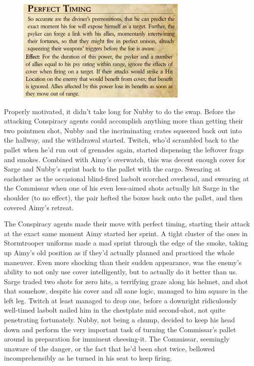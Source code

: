 \begin{figure}
	\begin{center}
		\includegraphics[width=\figwidth]{pics/21/108.png}
	\end{center}
\end{figure}
Properly motivated, it didn't take long for Nubby to do the swap. 
Before the attacking Conspiracy agents could accomplish anything more than getting their two pointmen shot, Nubby and the incriminating crates squeezed back out into the hallway, and the withdrawal started. 
Twitch, who'd scrambled back to the pallet when he'd run out of grenades again, started dispensing the leftover frags and smokes. 
Combined with Aimy's overwatch, this was decent enough cover for Sarge and Nubby's sprint back to the pallet with the cargo. 
Swearing at eachother as the occasional blind-fired lasbolt scorched overhead, and swearing at the Commissar when one of his even less-aimed shots actually hit Sarge in the shoulder (to no effect), the pair hefted the boxes back onto the pallet, and then covered Aimy's retreat.

The Conspiracy agents made their move with perfect timing, starting their attack at the exact same moment Aimy started her sprint. 
A tight cluster of the ones in Stormtrooper uniforms made a mad sprint through the edge of the smoke, taking up Aimy's old position as if they'd actually planned and practiced the whole maneuver. 
Even more shocking than their sudden appearance, was the enemy's ability to not only use cover intelligently, but to actually do it better than us. 
Sarge traded two shots for zero hits, a terrifying graze along his helmet, and shot that somehow, despite his cover and all sane logic, managed to him square in the left leg. 
Twitch at least managed to drop one, before a downright ridiculously well-timed lasbolt nailed him in the chestplate mid second-shot, not quite penetrating fortunately. 
Nubby, not being a chump, decided to keep his head down and perform the very important task of turning the Commissar's pallet around in preparation for imminent cheesing-it. 
The Commissar, seemingly unaware of the danger, or the fact that he'd been shot twice, bellowed incomprehensibly as he turned in his seat to keep firing.

